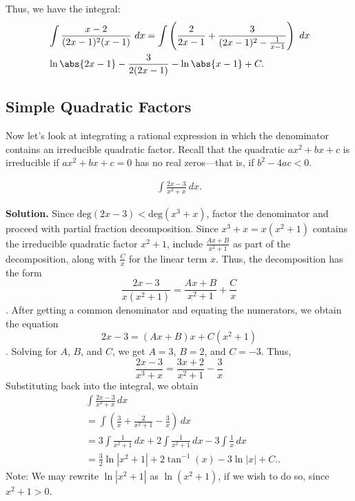 \documentclass{report}
\begin{document}
     \bigbreak \noindent 
     Thus, we have the integral:
     \begin{align*}
         &\int \frac{x-2}{(2x-1)^{2}(x-1)}\ dx  = \int \left(\frac{2}{2x-1} + \frac{3}{ (2x-1)^{2} - \frac{1}{x-1}}\right)\ dx \\
         &\ln{\abs{2x-1}} - \frac{3}{2(2x-1)} -\ln{\abs{{x-1}}} + C
     .\end{align*}

     \pagebreak \bigbreak \noindent 
     \subsection*{Simple Quadratic Factors}
     \bigbreak \noindent 
     Now let's look at integrating a rational expression in which the denominator contains an irreducible quadratic factor. Recall that the quadratic \( ax^2 + bx + c \) is irreducible if \( ax^2 + bx + c = 0 \) has no real zeros---that is, if \( b^2 - 4ac < 0 \). 
     \bigbreak \noindent 
     \begin{eg}
         \begin{align*}
             \int \frac{2x-3}{x^{3} +x}\ dx
         .\end{align*}
         
     \end{eg}
     \bigbreak \noindent 
     \textbf{Solution.} Since \( \text{deg}(2x-3) < \text{deg}(x^3 + x) \), factor the denominator and proceed with partial fraction decomposition. Since \( x^3 + x = x(x^2 + 1) \) contains the irreducible quadratic factor \( x^2 + 1 \), include \( \frac{Ax + B}{x^2 + 1} \) as part of the decomposition, along with \( \frac{C}{x} \) for the linear term \( x \). Thus, the decomposition has the form
    \[ \frac{2x-3}{x(x^2 + 1)} = \frac{Ax + B}{x^2 + 1} + \frac{C}{x} \].
    \bigbreak \noindent 
    After getting a common denominator and equating the numerators, we obtain the equation
    \[ 2x - 3 = (Ax + B)x + C(x^2 + 1) \].
    \bigbreak \noindent 
    Solving for \( A \), \( B \), and \( C \), we get \( A = 3 \), \( B = 2 \), and \( C = -3 \).
    \bigbreak \noindent 
    Thus,
    \[ \frac{2x - 3}{x^3 + x} = \frac{3x+2}{x^{2}+1} -\frac{3}{x}\]
        \bigbreak \noindent 
    Substituting back into the integral, we obtain
    \begin{align*}
        &\int \frac{2x - 3}{x^3 + x} \, dx \\
        &= \int \left( \frac{3}{x} + \frac{2}{x^2 + 1} - \frac{3}{x} \right) \, dx \\
        &= 3 \int \frac{1}{x^2 + 1} \, dx + 2 \int \frac{1}{x^2 + 1} \, dx - 3 \int \frac{1}{x} \, dx  \\
        &= \frac{3}{2} \ln \left| x^2 + 1 \right| + 2 \tan^{-1}(x) - 3 \ln |x| + C.
    .\end{align*}
    \bigbreak \noindent 
    Note: We may rewrite \( \ln \left| x^2 + 1 \right| \) as \( \ln(x^2 + 1) \), if we wish to do so, since \( x^2 + 1 > 0 \).
\end{document}
